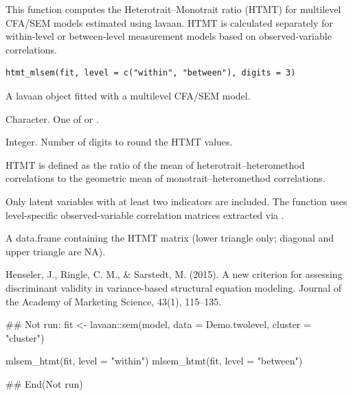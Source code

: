 \documentclass[a4paper]{book}
\begin{document}
%
\begin{Description}
This function computes the Heterotrait–Monotrait ratio (HTMT)
for multilevel CFA/SEM models estimated using lavaan.
HTMT is calculated separately for within-level or between-level
measurement models based on observed-variable correlations.
\end{Description}
%
\begin{Usage}
\begin{verbatim}
htmt_mlsem(fit, level = c("within", "between"), digits = 3)
\end{verbatim}
\end{Usage}
%
\begin{Arguments}
\begin{ldescription}
\item[\code{fit}] A lavaan object fitted with a multilevel CFA/SEM model.

\item[\code{level}] Character. One of  or .

\item[\code{digits}] Integer. Number of digits to round the HTMT values.
\end{ldescription}
\end{Arguments}
%
\begin{Details}
HTMT is defined as the ratio of the mean of heterotrait–heteromethod
correlations to the geometric mean of monotrait–heteromethod
correlations.

Only latent variables with at least two indicators are included.
The function uses level-specific observed-variable correlation
matrices extracted via .
\end{Details}
%
\begin{Value}
A data.frame containing the HTMT matrix
(lower triangle only; diagonal and upper triangle are NA).
\end{Value}
%
\begin{References}
Henseler, J., Ringle, C. M., \& Sarstedt, M. (2015).
A new criterion for assessing discriminant validity in
variance-based structural equation modeling.
Journal of the Academy of Marketing Science, 43(1), 115–135.
\end{References}
%
\begin{Examples}
\begin{ExampleCode}
\#\# Not run: 
fit <- lavaan::sem(model, data = Demo.twolevel, cluster = "cluster")

mlsem_htmt(fit, level = "within")
mlsem_htmt(fit, level = "between")

## End(Not run)
\end{ExampleCode}
\end{Examples}
\end{document}
